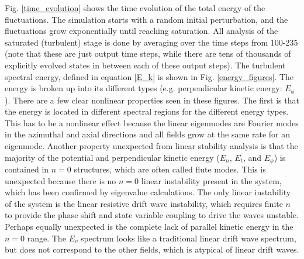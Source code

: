 \documentclass[twocolumn,showpacs,preprintnumbers,amsmath,amssymb]{revtex4}
\begin{document}
Fig. \ref{time_evolution} shows the time evolution of the total energy of the fluctuations. The simulation starts with a random initial perturbation, and the fluctuations grow
exponentially until reaching saturation. All analysis of the saturated (turbulent) stage is done by averaging over the time steps from 100-235 (note that these are just output time steps, while
there are tens of thousands of explicitly evolved states in between each of these output steps).
The turbulent spectral energy, defined in equation \ref{E_k} is shown in Fig. \ref{energy_figures}. The energy is broken up into its different types (e.g. perpendicular kinetic energy: $E_\phi$).
There are a few clear nonlinear properties
seen in these figures. The first is that the energy is located in different spectral regions for the different energy types. This has to be a nonlinear effect because the linear eigenmodes
are Fourier modes in the azimuthal and axial directions and all fields grow at the same rate for an eigenmode. 
Another property unexpected from linear stability analysis is that the majority of the potential and perpendicular kinetic energy ($E_n$, $E_t$, and $E_\phi$) is contained in $n=0$ structures, 
which are often called flute modes.
This is unexpected because there is no $n=0$ linear instability present in the system, which has been confirmed by eigenvalue calculations. The only linear instability of the system is the
linear resistive drift wave instability, which requires finite $n$ to provide the phase shift and state variable coupling to drive the waves unstable. Perhaps equally unexpected is the complete
lack of parallel kinetic energy in the $n=0$ range. The $E_v$ spectrum looks like a traditional linear drift wave spectrum, but does not correspond to the other fields, which is atypical of
linear drift waves.

\end{document}
